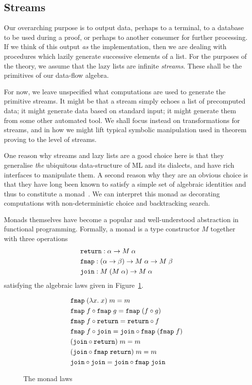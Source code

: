 \subsection{Streams}\label{sec:Streams}
Our overarching purpose is to output data, perhaps to a terminal, to a database to be used during a proof, or perhaps to another consumer for further processing. If we think of this output \emph{as} the implementation, then we are dealing with procedures which lazily generate successive elements of a list. For the purposes of the theory, we assume that the lazy lists are infinite \emph{streams}. These shall be the primitives of our data-flow algebra. 

For now, we leave unspecified what computations are used to generate the primitive streams. It might be that a stream simply echoes a list of precomputed data; it might generate data based on standard input; it might generate them from some other automated tool. We shall focus instead on transformations for streams, and in how we might lift typical symbolic manipulation used in theorem proving to the level of streams.

One reason why streams and lazy lists are a good choice here is that they generalise \emph{the} ubiquitous data-structure of ML and its dialects, and have rich interfaces to manipulate them. A second reason why they are an obvious choice is that they have long been known to satisfy a simple set of algebraic identities and thus to constitute a monad~\cite{MonadWadler}. We can interpret this monad as decorating computations with non-deterministic choice and backtracking search. 

Monads themselves have become a popular and well-understood abstraction in functional programming. Formally, a monad is a type constructor $M$ together with three operations 
\begin{align*}
&\texttt{return} : \alpha \rightarrow M\;\alpha\\
&\texttt{fmap} : (\alpha \rightarrow \beta) \rightarrow M\;\alpha \rightarrow M\;\beta\\
&\texttt{join} : M\;(M\;\alpha) \rightarrow M\;\alpha
\end{align*}
satisfying the algebraic laws given in Figure~\ref{fig:MonadLaws}.

\begin{figure}
\begin{align}
&\texttt{fmap}\;(\lambda x.\;x)\;m = m\notag\\
&\texttt{fmap}\;f \circ \texttt{fmap}\;g = \texttt{fmap}\;(f \circ g)\notag\\
&\texttt{fmap}\;f \circ \texttt{return} = \texttt{return}\circ f\notag\\
&\texttt{fmap}\;f \circ \texttt{join} = \texttt{join} \circ \texttt{fmap}\;(\texttt{fmap}\;f)\notag\\
&(\texttt{join} \circ \texttt{return})\;m = m\notag\\
&(\texttt{join} \circ \texttt{fmap}\;\texttt{return})\;m = m\notag\\
&\texttt{join} \circ \texttt{join} = \texttt{join} \circ \texttt{fmap}\;\texttt{join} \label{eq:JoinAssoc}
\end{align}
\caption{The monad laws}
\label{fig:MonadLaws}
\end{figure}

